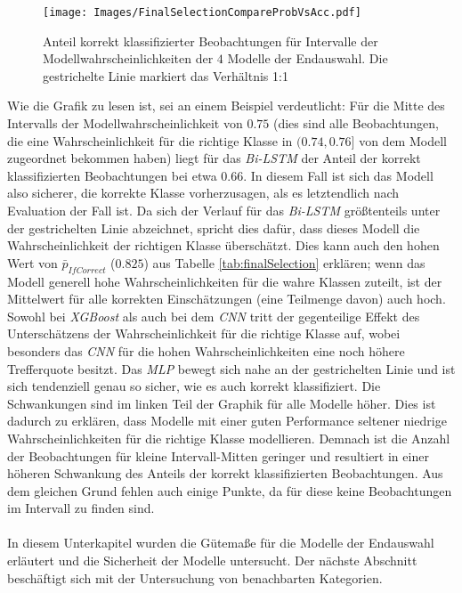 \documentclass[a4paper,11pt]{article}
\begin{document}
\begin{figure}[ht]
    \centering
\texttt{[image: Images/FinalSelectionCompareProbVsAcc.pdf]} 
\caption{Anteil korrekt klassifizierter Beobachtungen für Intervalle der Modellwahrscheinlichkeiten der $4$ Modelle der Endauswahl. Die gestrichelte Linie markiert das Verhältnis 1:1}
\label{abb:CompareProbVsAcc}
\end{figure}

Wie die Grafik zu lesen ist, sei an einem Beispiel verdeutlicht: Für die Mitte des Intervalls der Modellwahrscheinlichkeit von $0.75$ (dies sind alle Beobachtungen, die eine Wahrscheinlichkeit für die richtige Klasse in $(0.74,0.76]$ von dem Modell zugeordnet bekommen haben) liegt für das \textit{Bi-LSTM} der Anteil der korrekt klassifizierten Beobachtungen bei etwa $0.66$. In diesem Fall ist sich das Modell also sicherer, die korrekte Klasse vorherzusagen, als es letztendlich nach Evaluation der Fall ist. 
Da sich der Verlauf für das \textit{Bi-LSTM} größtenteils unter der gestrichelten Linie abzeichnet, spricht dies dafür, dass dieses Modell die Wahrscheinlichkeit der richtigen Klasse überschätzt. Dies kann auch den hohen Wert von $\bar{p}_{IfCorrect}$ ($0.825$) aus Tabelle \ref{tab:finalSelection} erklären; wenn das Modell generell hohe Wahrscheinlichkeiten für die wahre Klassen zuteilt, ist der Mittelwert für alle korrekten Einschätzungen (eine Teilmenge davon) auch hoch. Sowohl bei \textit{XGBoost} als auch bei dem \textit{CNN} tritt der gegenteilige Effekt des Unterschätzens der Wahrscheinlichkeit für die richtige Klasse auf, wobei besonders das \textit{CNN} für die hohen Wahrscheinlichkeiten eine noch höhere Trefferquote besitzt. Das \textit{MLP} bewegt sich nahe an der gestrichelten Linie und ist sich tendenziell genau so sicher, wie es auch korrekt klassifiziert. Die Schwankungen sind im linken Teil der Graphik für alle Modelle höher. Dies ist dadurch zu erklären, dass Modelle mit einer guten Performance seltener niedrige Wahrscheinlichkeiten für die richtige Klasse modellieren. Demnach ist die Anzahl der Beobachtungen für kleine Intervall-Mitten geringer und resultiert in einer höheren Schwankung des Anteils der korrekt klassifizierten Beobachtungen. Aus dem gleichen Grund fehlen auch einige Punkte, da für diese keine Beobachtungen im Intervall zu finden sind. \\
\\
In diesem Unterkapitel wurden die Gütemaße für die Modelle der Endauswahl erläutert und die Sicherheit der Modelle untersucht. Der nächste Abschnitt beschäftigt sich mit der Untersuchung von benachbarten Kategorien.
\end{document}
